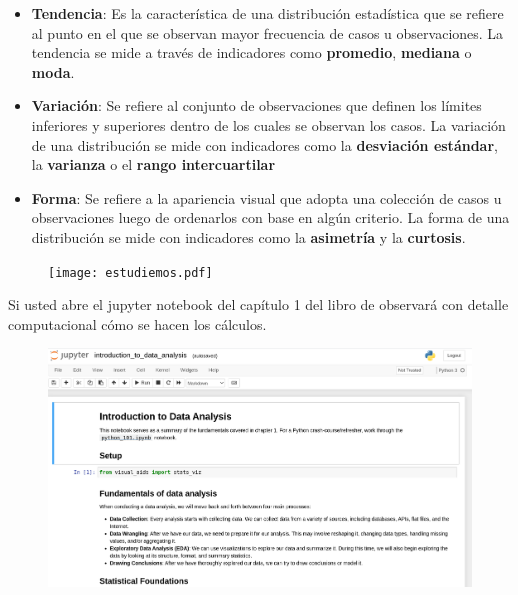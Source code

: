 \documentclass[aspectratio=169]{beamer}
\begin{document}
\begin{frame}
\begin{itemize}
\item \textbf{Tendencia}: Es la característica de una distribución estadística que se refiere al punto en el que se observan mayor frecuencia de casos u observaciones. La tendencia se mide a través de indicadores como \textbf{promedio}, \textbf{mediana} o \textbf{moda}.
\vspace{0.2cm}
\item \textbf{Variación}: Se refiere al conjunto de observaciones que definen los límites inferiores y superiores dentro de los cuales se observan los casos. La variación de una distribución se mide con indicadores como la \textbf{desviación estándar}, la \textbf{varianza} o el \textbf{rango intercuartilar}
\vspace{0.2cm}
\item \textbf{Forma}: Se refiere a la apariencia visual que adopta una colección de casos u observaciones luego de ordenarlos con base en algún criterio. La forma de una distribución se mide con indicadores como la \textbf{asimetría} y la \textbf{curtosis}.
\end{itemize}    
\end{frame}


\begin{frame}
\begin{figure}
\centering
\texttt{[image: estudiemos.pdf]}
\end{figure}
\end{frame}


\begin{frame}
Si usted abre el jupyter notebook del capítulo 1 del libro de \citeauthor{Molin2021} \citeyear{Molin2021} observará con detalle computacional cómo se hacen los cálculos.
\begin{figure}
\centering
\includegraphics[width=.65\textwidth]{c1.png}
\end{figure}
\end{frame}
\end{document}
